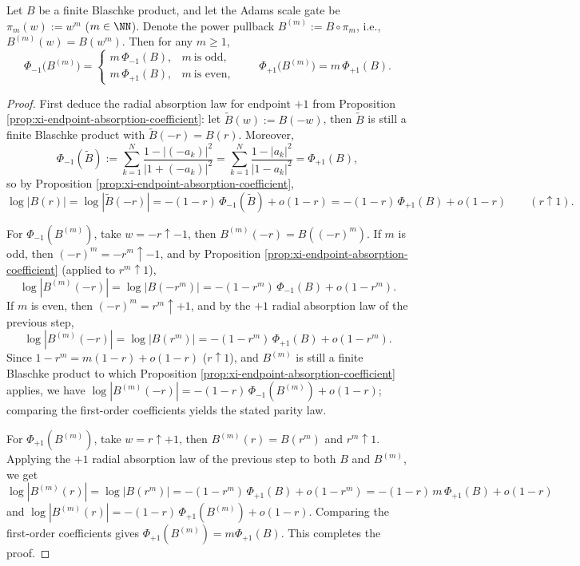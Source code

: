 \begin{theorem}\label{thm:xi-endpoint-absorption-adams-rescaling}
Let \(B\) be a finite Blaschke product, and let the Adams scale gate be \(\pi_m(w):=w^m\) (\(m\in\NN\)).
Denote the power pullback \(B^{(m)}:=B\circ\pi_m\), i.e., \(B^{(m)}(w)=B(w^m)\).
Then for any \(m\ge 1\),
\[
\boxed{\;
\Phi_{-1}\bigl(B^{(m)}\bigr)=
\begin{cases}
m\,\Phi_{-1}(B),& m\ \text{is odd},\\[2pt]
m\,\Phi_{+1}(B),& m\ \text{is even},
\end{cases}
\qquad
\Phi_{+1}\bigl(B^{(m)}\bigr)=m\,\Phi_{+1}(B).\;}
\]
\end{theorem}

\begin{proof}
First deduce the radial absorption law for endpoint \(+1\) from Proposition \ref{prop:xi-endpoint-absorption-coefficient}: let \(\widetilde B(w):=B(-w)\), then \(\widetilde B\) is still a finite Blaschke product with \(\widetilde B(-r)=B(r)\).
Moreover,
\[
\Phi_{-1}(\widetilde B)
:=\sum_{k=1}^{N}\frac{1-|(-a_k)|^2}{|1+(-a_k)|^2}
=\sum_{k=1}^{N}\frac{1-|a_k|^2}{|1-a_k|^2}
=\Phi_{+1}(B),
\]
so by Proposition \ref{prop:xi-endpoint-absorption-coefficient},
\[
\log|B(r)|
=\log|\widetilde B(-r)|
=-(1-r)\,\Phi_{-1}(\widetilde B)+o(1-r)
=-(1-r)\,\Phi_{+1}(B)+o(1-r)
\qquad(r\uparrow 1).
\]
\par
For \(\Phi_{-1}(B^{(m)})\), take \(w=-r\uparrow-1\), then
\(
B^{(m)}(-r)=B((-r)^m)
\).
If \(m\) is odd, then \((-r)^m=-r^m\uparrow-1\), and by Proposition \ref{prop:xi-endpoint-absorption-coefficient} (applied to \(r^m\uparrow 1\)),
\[
\log|B^{(m)}(-r)|=\log|B(-r^m)|=-(1-r^m)\,\Phi_{-1}(B)+o(1-r^m).
\]
If \(m\) is even, then \((-r)^m=r^m\uparrow+1\), and by the \(+1\) radial absorption law of the previous step,
\[
\log|B^{(m)}(-r)|=\log|B(r^m)|=-(1-r^m)\,\Phi_{+1}(B)+o(1-r^m).
\]
Since \(1-r^m=m(1-r)+o(1-r)\) (\(r\uparrow 1\)), and \(B^{(m)}\) is still a finite Blaschke product to which Proposition \ref{prop:xi-endpoint-absorption-coefficient} applies, we have
\(
\log|B^{(m)}(-r)|=-(1-r)\,\Phi_{-1}(B^{(m)})+o(1-r)
\);
comparing the first-order coefficients yields the stated parity law.
\par
For \(\Phi_{+1}(B^{(m)})\), take \(w=r\uparrow+1\), then \(B^{(m)}(r)=B(r^m)\) and \(r^m\uparrow 1\).
Applying the \(+1\) radial absorption law of the previous step to both \(B\) and \(B^{(m)}\), we get
\[
\log|B^{(m)}(r)|
=\log|B(r^m)|
=-(1-r^m)\,\Phi_{+1}(B)+o(1-r^m)
=-(1-r)\,m\,\Phi_{+1}(B)+o(1-r)
\]
and
\(
\log|B^{(m)}(r)|=-(1-r)\,\Phi_{+1}(B^{(m)})+o(1-r)
\).
Comparing the first-order coefficients gives \(\Phi_{+1}(B^{(m)})=m\Phi_{+1}(B)\). This completes the proof.
\end{proof}

